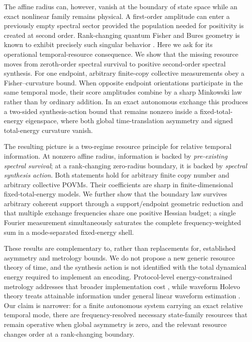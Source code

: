 The affine radius can, however, vanish at the boundary of state space while an exact nonlinear family remains physical. A first-order amplitude can enter a previously empty spectral sector provided the population needed for positivity is created at second order. Rank-changing quantum Fisher and Bures geometry is known to exhibit precisely such singular behavior \cite{Safranek2017}. Here we ask for its operational temporal-resource consequence. We show that the missing resource moves from zeroth-order spectral survival to positive second-order spectral synthesis. For one endpoint, arbitrary finite-copy collective measurements obey a Fisher--curvature bound. When opposite endpoint orientations participate in the same temporal mode, their score amplitudes combine by a sharp Minkowski law rather than by ordinary addition. In an exact autonomous exchange this produces a two-sided synthesis-action bound that remains nonzero inside a fixed-total-energy eigenspace, where both global time-translation asymmetry and signed total-energy curvature vanish.

The resulting picture is a two-regime resource principle for relative temporal information. At nonzero affine radius, information is backed by \emph{pre-existing spectral survival}; at a rank-changing zero-radius boundary, it is backed by \emph{spectral synthesis action}. Both statements hold for arbitrary finite copy number and arbitrary collective POVMs. Their coefficients are sharp in finite-dimensional fixed-total-energy models. We further show that the boundary law survives arbitrary coherent support through a support/endpoint geometric reduction and that multiple exchange frequencies share one positive Hessian budget; a single Fourier measurement simultaneously saturates the complete frequency-weighted sum in a mode-separated fixed-energy shell.

These results are complementary to, rather than replacements for, established asymmetry and metrology bounds. We do not propose a new generic resource theory of time, and the synthesis action is not identified with the total dynamical energy required to implement an encoding. Protocol-level energy-constrained metrology addresses that broader implementation cost \cite{ChenYang2026}, while waveform Holevo theory treats attainable information under general linear waveform estimation \cite{GardnerEtAl2024}. Our claim is narrower: for a finite autonomous system carrying an exact relative temporal mode, there are frequency-resolved necessary state-family resources that remain operative when global asymmetry is zero, and the relevant resource changes order at a rank-changing boundary.
